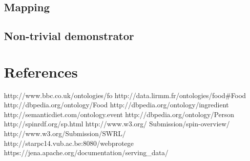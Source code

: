 \subsection*{Mapping} 

\subsection*{Non-trivial demonstrator} 


\section*{References}
http://www.bbc.co.uk/ontologies/fo\newline
http://data.lirmm.fr/ontologies/food\#Food\newline
http://dbpedia.org/ontology/Food \newline
http://dbpedia.org/ontology/ingredient\newline
http://semanticdiet.com/ontology.event \newline
http://dbpedia.org/ontology/Person \newline
http://spinrdf.org/sp.html\newline
http://www.w3.org/
Submission/spin-overview/\newline
http://www.w3.org/Submission/SWRL/\newline
http://starpc14.vub.ac.be:8080/webprotege \newline
https://jena.apache.org/documentation/serving\_data/

